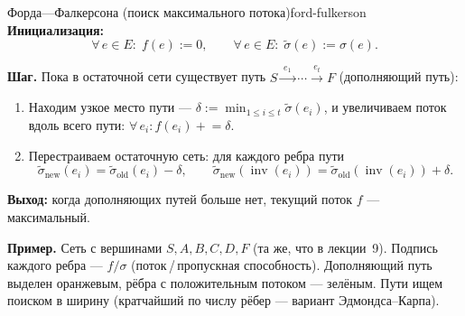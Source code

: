 \begin{algo}{Форда—Фалкерсона (поиск максимального потока)}{ford-fulkerson}
\textbf{Инициализация:}
\[
  \forall\, e \in E\colon\; f(e) := 0, \qquad
  \forall\, e \in E\colon\; \tilde{\sigma}(e) := \sigma(e).
\]

\textbf{Шаг.} Пока в остаточной сети существует путь $S \xrightarrow{\;e_1\;} \cdots
\xrightarrow{\;e_t\;} F$ (дополняющий путь):

\begin{enumerate}
  \item Находим узкое место пути ---
        $\displaystyle \delta := \min_{1 \le i \le t} \tilde{\sigma}(e_i)$,
        и увеличиваем поток вдоль всего пути:
        $\forall\, e_i\colon f(e_i) \mathrel{+}= \delta$.

  \item Перестраиваем остаточную сеть: для каждого ребра пути
        \[
          \tilde{\sigma}_{\text{new}}(e_i) = \tilde{\sigma}_{\text{old}}(e_i) - \delta,
          \qquad
          \tilde{\sigma}_{\text{new}}(\operatorname{inv}(e_i))
            = \tilde{\sigma}_{\text{old}}(\operatorname{inv}(e_i)) + \delta.
        \]
\end{enumerate}

\textbf{Выход:} когда дополняющих путей больше нет, текущий поток $f$ --- максимальный.

\medskip
\noindent\textbf{Пример.} Сеть с вершинами $S, A, B, C, D, F$ (та же, что
в лекции~9). Подпись каждого ребра --- $f/\sigma$
(поток\,/\,пропускная способность). Дополняющий путь выделен оранжевым,
рёбра с положительным потоком --- зелёным. Пути ищем поиском в ширину
(кратчайший по числу рёбер --- вариант Эдмондса--Карпа).


\end{algo}

